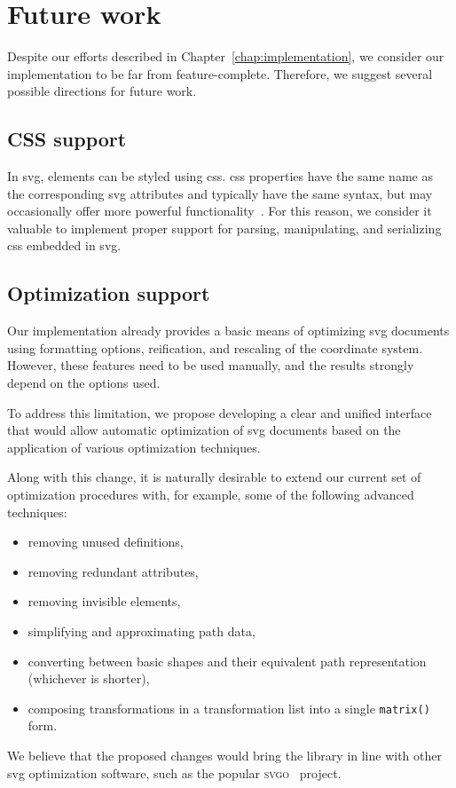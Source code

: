 \chapter{Future work}\label{chap:future-work}

Despite our efforts described in Chapter~\ref{chap:implementation}, we consider our implementation to be far from feature-complete. Therefore, we suggest several possible directions for future work.

\section{CSS support}

In \gls{svg}, elements can be styled using \gls{css}. \gls{css} properties have the same name as the corresponding \gls{svg} attributes and typically have the same syntax, but may occasionally offer more powerful functionality~\cite{svg11}. For this reason, we consider it valuable to implement proper support for parsing, manipulating, and serializing \gls{css} embedded in \gls{svg}.

\section{Optimization support}

Our implementation already provides a basic means of optimizing \gls{svg} documents using formatting options, reification, and rescaling of the coordinate system. However, these features need to be used manually, and the results strongly depend on the options used.

To address this limitation, we propose developing a clear and unified interface that would allow automatic optimization of \gls{svg} documents based on the application of various optimization techniques.

Along with this change, it is naturally desirable to extend our current set of optimization procedures with, for example, some of the following advanced techniques:
\begin{itemize}
    \item removing unused definitions,
    \item removing redundant attributes,
    \item removing invisible elements,
    \item simplifying and approximating path data,
    \item converting between basic shapes and their equivalent path representation (whichever is shorter),
    \item composing transformations in a transformation list into a single \texttt{matrix()} form.
\end{itemize}

We believe that the proposed changes would bring the library in line with other \gls{svg} optimization software, such as the popular \textsc{svgo}~\cite{svgo} project.
